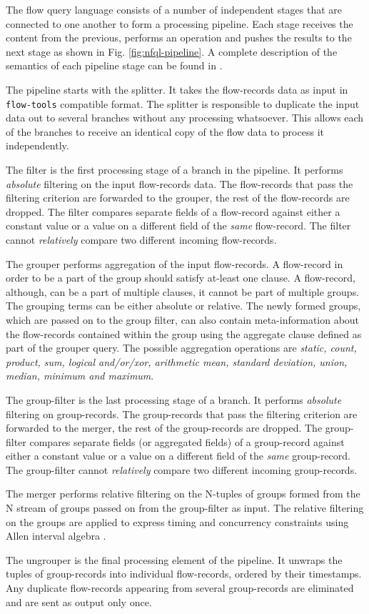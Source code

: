 The flow query language consists of a number of independent stages that are
connected to one another to form a processing pipeline.  Each stage receives
the content from the previous, performs an operation and pushes the results to
the next stage as shown in Fig. \ref{fig:nfql-pipeline}. A complete
description of the semantics of each pipeline stage can be found in
\cite{vmarinov:2009}.

The pipeline starts with the splitter. It takes the flow-records data as input
in \texttt{flow-tools} compatible format. The splitter is responsible to
duplicate the input data out to several branches without any processing
whatsoever. This allows each of the branches to receive an identical copy of
the flow data to process it independently.

The filter is the first processing stage of a branch in the pipeline.  It
performs \emph{absolute} filtering on the input flow-records data.  The
flow-records that pass the filtering criterion are forwarded to the grouper,
the rest of the flow-records are dropped. The filter compares separate fields
of a flow-record against either a constant value or a value on a different
field of the \emph{same} flow-record. The filter cannot \emph{relatively}
compare two different incoming flow-records.

The grouper performs aggregation of the input flow-records. A flow-record in
order to be a part of the group should satisfy at-least one clause. A
flow-record, although, can be a part of multiple clauses, it cannot be part of
multiple groups. The grouping terms can be either absolute or relative. The
newly formed groups, which are passed on to the group filter, can also contain
meta-information about the flow-records contained within the group using the
aggregate clause defined as part of the grouper query. The possible
aggregation operations are \emph{static, count, product, sum, logical
and/or/xor, arithmetic mean, standard deviation, union, median, minimum and
maximum}.

The group-filter is the last processing stage of a branch. It performs
\emph{absolute} filtering on group-records. The group-records
that pass the filtering criterion are forwarded to the merger, the rest of the
group-records are dropped. The group-filter compares separate fields (or
aggregated fields) of a group-record against either a constant value or a value
on a different field of the \emph{same} group-record. The group-filter cannot
\emph{relatively} compare two different incoming group-records.

The merger performs relative filtering on the N-tuples of groups formed from
the N stream of groups passed on from the group-filter as input. The relative
filtering on the groups are applied to express timing and concurrency
constraints using Allen interval algebra \cite{fallen:1983}.

The ungrouper is the final processing element of the pipeline. It unwraps the
tuples of group-records into individual flow-records, ordered by their
timestamps. Any duplicate flow-records appearing from several group-records
are eliminated and are sent as output only once.

